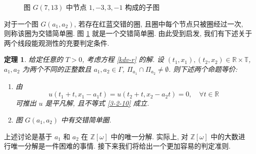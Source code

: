 \documentclass[master]{cugthesis}
\newcommand\R{\ensuremath{\mathbb{R}}}
\newcommand\Z{\ensuremath{\mathbb{Z}}}
\newcommand\T{\ensuremath{\mathbb{T}}}
\newtheorem{theorem}{定理}[chapter]
\begin{document}
 \begin{figure}[htbp]
     \centering
     \caption{图 $G(7,13)$ 中节点 $1,-3,3,-1$ 构成的子图}
     \label{red-blue-example}
 \end{figure}
 对于一个图 $G(a_1,a_2)$, 若存在红蓝交错的圈, 且圈中每个节点只被圈经过一次, 则称该圈为交错简单圈. 图 \ref{red-blue-example} 就是一个交错简单圈. 由此受到启发, 我们有下述关于两个线段能观测性的充要判定条件.
 
\begin{theorem}
给定任意的 $T>0$, 考虑方程 \eqref{kdv-r} 的解. 设 $(t_1,x_1),(t_2,x_2)\in \R\times \T$, $a_1,a_2$ 为两个不同的正整数且 $a_1,a_2\in \Gamma$, $\Pi_{a_1}\cap \Pi_{a_2}\neq \emptyset$. 则下述两个命题等价:
\begin{enumerate}
    \item[\rm{(1)}] 由 
    \begin{equation*}
        u(t_1+t,x_1-a_1 t)=u(t_2+t,x_2-a_2t)=0,\quad \forall t\in \R
    \end{equation*}
    可推出 $u$ 是平凡解,  且不等式 \eqref{3-2-10} 成立.
    \item [\rm{(2)}] 图 $G(a_1,a_2)$ 中有交错简单圈.
\end{enumerate}
\end{theorem}



 
 上述讨论是基于 $a_1$ 和 $a_2$ 在 $\Z [\omega]$ 中的唯一分解. 实际上, 对 $\Z [\omega]$ 中的大数进行唯一分解是一件困难的事情. 接下来我们将给出一个更加容易的判定准则. 
    
\end{document}
